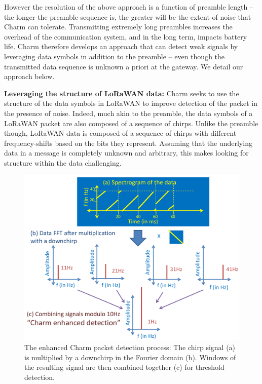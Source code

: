 However the resolution of the above approach is a function of preamble length
-- the longer the preamble sequence is, the greater will be the extent of
noise that Charm can tolerate. Transmitting extremely long preambles increases
the overhead of the communication system, and in the long term, impacts
battery life. Charm therefore develops an approach that can detect weak
signals by leveraging data symbols in addition to the preamble -- even though
the transmitted data sequence is unknown a priori at the gateway. We detail
our approach below.

\noindent \textbf{Leveraging the structure of LoRaWAN data: } Charm seeks to
use the structure of the data symbols in LoRaWAN to improve detection of the
packet in the presence of noise. Indeed, much akin to the preamble, the data
symbols of a LoRaWAN packet are also composed of a sequence of chirps. Unlike
the preamble though, LoRaWAN data is composed of a sequence of chirps with
different frequency-shifts based on the bits they represent. Assuming that the
underlying data in a message is completely unknown and arbitrary, this makes
looking for structure within the data challenging.


\begin{figure}
    \centering
    \includegraphics[width=0.85\columnwidth]{figures/CharmEnhancedDetection_cropped}
        \vspace*{-0.1in}
    \caption{The enhanced Charm packet detection process: The chirp signal (a)
    is multiplied by a downchirp in the Fourier domain (b). Windows of the
    resulting signal are then combined together (c) for threshold detection.}
    \label{fig:enhanced_charm}
    \compactimg
\end{figure}

